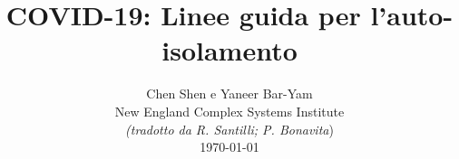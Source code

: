 \documentclass[onecolumn,journal]{IEEEtran}
\begin{document}
\title{\color{Brown} COVID-19: Linee guida per l’auto-isolamento
 \\
\vspace{-0.35ex}}
\author{Chen Shen e Yaneer Bar-Yam \\ New England Complex Systems Institute \\
\vspace{+0.35ex}
\small{\textit{(tradotto da R. Santilli; P. Bonavita})}\\
 \today
  \vspace{-14ex} \\


\bigskip
\bigskip

\textbf{}
 }

\maketitle


\flushbottom %



\thispagestyle{empty} %




\renewcommand{\thefootnote}{\fnsymbol{footnote}}
\end{document}

